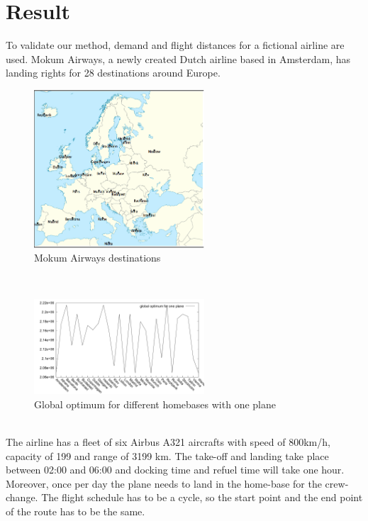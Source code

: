 \documentclass[journal]{IEEEtran}
\begin{document}
\section{Result}
To validate our method, demand and flight distances for a fictional airline are used. Mokum Airways, a newly created Dutch airline based in Amsterdam, has landing rights for 28 destinations around Europe.\\
\begin{figure}[!h]
\centering
\includegraphics[width=2.5in]{europe}
\caption{Mokum Airways destinations}
\label{fig:europe}
\end{figure}
\\
\begin{figure}[!h]
\centering
\includegraphics[width=2.5in]{different_homebases_one_plane}
\caption{Global optimum for different homebases with one plane}
\label{fig:different_homebase_one_plane}
\end{figure}
\\
The airline has a fleet of six Airbus A321 aircrafts with speed of 800km/h, capacity of 199 and range of 3199 km.  The take-off and landing take place between 02:00 and 06:00 and docking time and refuel time will take one hour. Moreover, once per day the plane needs to land in the home-base for the crew-change. The flight schedule has to be a cycle, so the start point and the end point of the route has to be the same. \\
\end{document}
